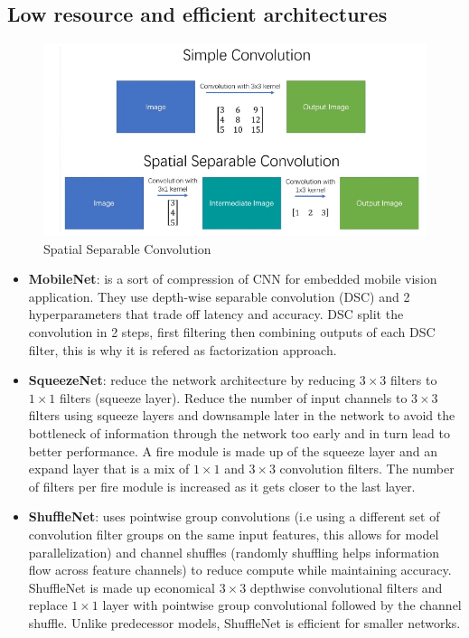 \subsection{Low resource and efficient architectures}
\begin{figure}[!ht]
    \centering
    \includegraphics[width=0.5\linewidth]{img/CNN/spatialConv.png}
    \caption{Spatial Separable Convolution}
    \label{fig:spatialConv}
\end{figure}
\begin{itemize}
    \item \textbf{MobileNet}: is a sort of compression of CNN for embedded mobile vision
          application. They use depth-wise separable convolution (DSC) and 2 hyperparameters
          that trade off latency and accuracy. DSC split the convolution in 2 steps,
          first filtering then combining outputs of each DSC filter, this is why it
          is refered as factorization approach.
    \item \textbf{SqueezeNet}: reduce the network architecture by reducing $3\times3$ filters
          to $1\times1$ filters (squeeze layer). Reduce the number of input channels to $3\times3$
          filters using squeeze layers and downsample later in the network to avoid the bottleneck of
          information through the network too early and in turn lead to better performance. A fire module is
          made up of the squeeze layer and an expand layer that is a mix of $1\times1$ and $3\times3$
          convolution filters. The number of filters per fire module is increased as it gets closer to the
          last layer.
    \item \textbf{ShuffleNet}: uses pointwise group convolutions (i.e using a different set of
          convolution filter groups on the same input features, this allows for model parallelization) and
          channel shuffles (randomly shuffling helps information flow across feature channels) to reduce
          compute while maintaining accuracy. ShuffleNet is made up economical $3\times3$ depthwise
          convolutional filters and replace $1\times1$ layer with pointwise group convolutional followed by
          the channel shuffle. Unlike predecessor models, ShuffleNet is efficient for smaller networks.

\end{itemize}
